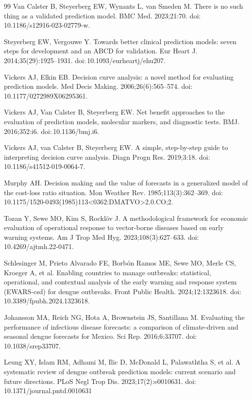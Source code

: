 \documentclass[11pt,a4paper]{article}
\begin{document}
\begin{thebibliography}{99}
 Van Calster B, Steyerberg EW, Wynants L, van Smeden M. There is no such thing as a validated prediction model. BMC Med. 2023;21:70. doi:\,10.1186/s12916-023-02779-w.

 Steyerberg EW, Vergouwe Y. Towards better clinical prediction models: seven steps for development and an ABCD for validation. Eur Heart J. 2014;35(29):1925--1931. doi:\,10.1093/eurheartj/ehu207.

 Vickers AJ, Elkin EB. Decision curve analysis: a novel method for evaluating prediction models. Med Decis Making. 2006;26(6):565--574. doi:\,10.1177/0272989X06295361.

 Vickers AJ, Van Calster B, Steyerberg EW. Net benefit approaches to the evaluation of prediction models, molecular markers, and diagnostic tests. BMJ. 2016;352:i6. doi:\,10.1136/bmj.i6.

 Vickers AJ, van Calster B, Steyerberg EW. A simple, step-by-step guide to interpreting decision curve analysis. Diagn Progn Res. 2019;3:18. doi:\,10.1186/s41512-019-0064-7.

 Murphy AH. Decision making and the value of forecasts in a generalized model of the cost-loss ratio situation. Mon Weather Rev. 1985;113(3):362--369. doi:\,10.1175/1520-0493(1985)113\textless0362:DMATVO\textgreater2.0.CO;2.

 Tozan Y, Sewe MO, Kim S, Rockl\"ov J. A methodological framework for economic evaluation of operational response to vector-borne diseases based on early warning systems. Am J Trop Med Hyg. 2023;108(3):627--633. doi:\,10.4269/ajtmh.22-0471.

 Schlesinger M, Prieto Alvarado FE, Borb\'on Ramos ME, Sewe MO, Merle CS, Kroeger A, et al. Enabling countries to manage outbreaks: statistical, operational, and contextual analysis of the early warning and response system (EWARS-csd) for dengue outbreaks. Front Public Health. 2024;12:1323618. doi:\,10.3389/fpubh.2024.1323618.

 Johansson MA, Reich NG, Hota A, Brownstein JS, Santillana M. Evaluating the performance of infectious disease forecasts: a comparison of climate-driven and seasonal dengue forecasts for Mexico. Sci Rep. 2016;6:33707. doi:\,10.1038/srep33707.

 Leung XY, Islam RM, Adhami M, Ilic D, McDonald L, Palawaththa S, et al. A systematic review of dengue outbreak prediction models: current scenario and future directions. PLoS Negl Trop Dis. 2023;17(2):e0010631. doi:\,10.1371/journal.pntd.0010631


\end{thebibliography}
\end{document}
